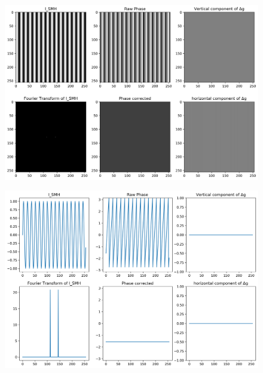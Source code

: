 \documentclass[12pt, titlepage]{article}
\begin{document}
 

\begin{figure}[H]
\begin{center}
\includegraphics[scale=0.5]{Figures/Test_2_explanation.png}
\caption{}
\label{fig:Test_2_explanation}
\end{center}
\end{figure}

\begin{figure}[H]
\begin{center}
\includegraphics[scale=0.5]{Figures/Test_2_explanation_1D.png}
\caption{}
\label{fig:Test_2_explaination_1D}
\end{center}
\end{figure}
\end{document}
